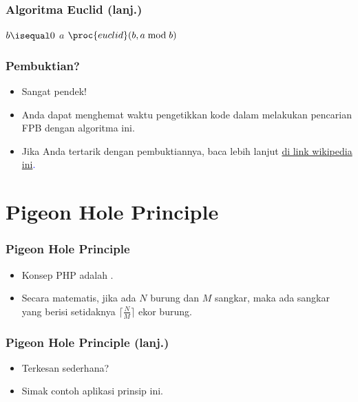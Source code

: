 \begin{frame}[fragile]
\frametitle{Algoritma Euclid (lanj.)}
\begin{codebox}
\li \If $b \isequal 0$
    \Then
\li   \Return $a$
\li \Else
\li   \Return $\proc{euclid}(b, a \bmod b)$ 
    \End
\end{codebox}
\end{frame}

\begin{frame}
\frametitle{Pembuktian?}
\begin{itemize}
  \item Sangat pendek!
  \item Anda dapat menghemat waktu pengetikkan kode dalam melakukan pencarian FPB dengan algoritma ini.
  \item Jika Anda tertarik dengan pembuktiannya, baca lebih lanjut \textcolor{blue}{\href{https://en.wikipedia.org/wiki/Euclidean_algorithm}{di link wikipedia ini}.}
\end{itemize}   
\end{frame}

\section{Pigeon Hole Principle}
\frame{\sectionpage}

\begin{frame}
\frametitle{Pigeon Hole Principle}
\begin{itemize}
  \item Konsep PHP adalah .
  \item Secara matematis, jika ada $N$ burung dan $M$ sangkar, maka ada sangkar yang berisi setidaknya $\big\lceil \frac{N}{M} \big\rceil$ ekor burung.
\end{itemize}
\end{frame}

\begin{frame}
\frametitle{Pigeon Hole Principle (lanj.)}
\begin{itemize}
  \item Terkesan sederhana?
  \item Simak contoh aplikasi prinsip ini.
\end{itemize}
\end{frame}

